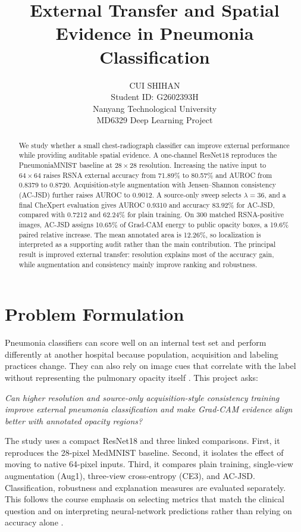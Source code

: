 \documentclass{article}
\title{External Transfer and Spatial Evidence in Pneumonia Classification}
\author{CUI SHIHAN\\Student ID: G2602393H\\Nanyang Technological University\\MD6329 Deep Learning Project}
\begin{document}
\maketitle
\thispagestyle{plain}

\begin{abstract}
We study whether a small chest-radiograph classifier can improve external performance while providing auditable spatial evidence. A one-channel ResNet18 reproduces the PneumoniaMNIST baseline at $28\times28$ resolution. Increasing the native input to $64\times64$ raises RSNA external accuracy from 71.89\% to 80.57\% and AUROC from 0.8379 to 0.8720. Acquisition-style augmentation with Jensen--Shannon consistency (AC-JSD) further raises AUROC to 0.9012. A source-only sweep selects $\lambda=36$, and a final CheXpert evaluation gives AUROC 0.9310 and accuracy 83.92\% for AC-JSD, compared with 0.7212 and 62.24\% for plain training. On 300 matched RSNA-positive images, AC-JSD assigns 10.65\% of Grad-CAM energy to public opacity boxes, a 19.6\% paired relative increase. The mean annotated area is 12.26\%, so localization is interpreted as a supporting audit rather than the main contribution. The principal result is improved external transfer: resolution explains most of the accuracy gain, while augmentation and consistency mainly improve ranking and robustness.
\end{abstract}

\section{Problem Formulation}
Pneumonia classifiers can score well on an internal test set and perform differently at another hospital because population, acquisition and labeling practices change. They can also rely on image cues that correlate with the label without representing the pulmonary opacity itself \citep{zech2018,geirhos2020}. This project asks:

\emph{Can higher resolution and source-only acquisition-style consistency training improve external pneumonia classification and make Grad-CAM evidence align better with annotated opacity regions?}

The study uses a compact ResNet18 and three linked comparisons. First, it reproduces the 28-pixel MedMNIST baseline. Second, it isolates the effect of moving to native 64-pixel inputs. Third, it compares plain training, single-view augmentation (Aug1), three-view cross-entropy (CE3), and AC-JSD. Classification, robustness and explanation measures are evaluated separately. This follows the course emphasis on selecting metrics that match the clinical question and on interpreting neural-network predictions rather than relying on accuracy alone \citep{lecture02,lecture11}.
\end{document}
